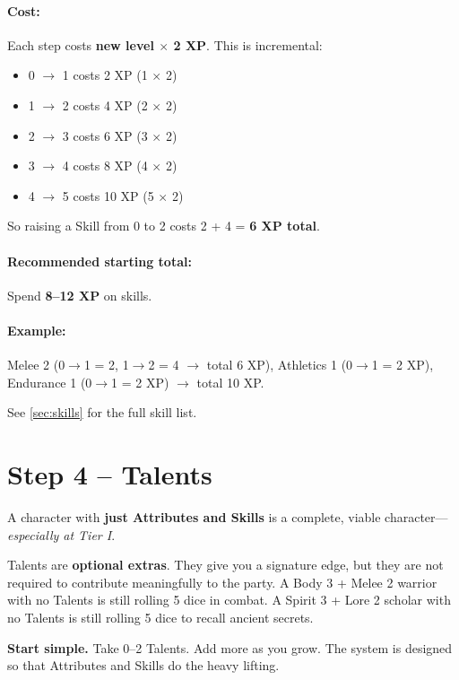 \paragraph{Cost:} Each step costs \textbf{new level \(\times\) 2 XP}. This is incremental:
\begin{itemize}
  \item 0 $\to$ 1 costs 2 XP (1 $\times$ 2)
  \item 1 $\to$ 2 costs 4 XP (2 $\times$ 2)
  \item 2 $\to$ 3 costs 6 XP (3 $\times$ 2)
  \item 3 $\to$ 4 costs 8 XP (4 $\times$ 2)
  \item 4 $\to$ 5 costs 10 XP (5 $\times$ 2)
\end{itemize}
So raising a Skill from 0 to 2 costs 2 + 4 = \textbf{6 XP total}.

\paragraph{Recommended starting total:} Spend \textbf{8--12 XP} on skills.

\paragraph{Example:} Melee 2 (0$\to$1 = 2, 1$\to$2 = 4 $\rightarrow$ total 6 XP), Athletics 1 (0$\to$1 = 2 XP), Endurance 1 (0$\to$1 = 2 XP) $\rightarrow$ total 10 XP.

See \ref{sec:skills} for the full skill list.

\section{Step 4 -- Talents}

\begin{tcolorbox}[colback=blue!5!white,colframe=blue!75!black,title=You Don't Need Talents to Be Effective,breakable]
A character with \textbf{just Attributes and Skills} is a complete, viable character---\textit{especially at Tier I}.

Talents are \textbf{optional extras}. They give you a signature edge, but they are not required to contribute meaningfully to the party. A Body 3 + Melee 2 warrior with no Talents is still rolling 5 dice in combat. A Spirit 3 + Lore 2 scholar with no Talents is still rolling 5 dice to recall ancient secrets.

\textbf{Start simple.} Take 0--2 Talents. Add more as you grow. The system is designed so that Attributes and Skills do the heavy lifting.
\end{tcolorbox}

